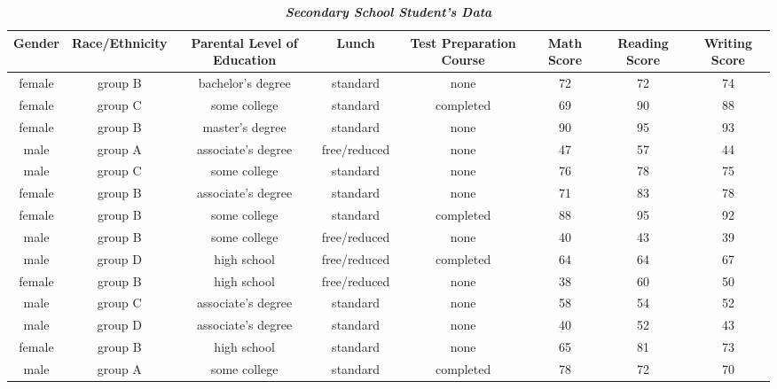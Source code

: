 \documentclass{article}
\begin{document}
 	\begin{table}[h!]
 		\begin{center}
 			\caption{\textbf{\textit{Secondary School Student's Data}}}
 			\label{tab:table1}
 			\begin{tabular}{|c|c|c|c|c|c|c|c|}
 				\hline
 			\textbf{Gender} & \textbf{Race/Ethnicity} & \textbf{Parental Level of Education} & \textbf{Lunch} & \textbf{Test Preparation Course} & \textbf{Math Score} & \textbf{Reading Score} & \textbf{Writing Score}\\
 				\hline
 				female & group B & bachelor's degree & standard & none & 72 & 72 & 74\\
 				\hline
 				female & group C & some college & standard & completed & 69 & 90 & 88\\
 				\hline
 				female & group B & master's degree & standard & none & 90 & 95 & 93\\
 				\hline
 				male & group A & associate's degree & free/reduced & none & 47 & 57 & 44\\
 				\hline
 				male & group C & some college & standard & none & 76 & 78 & 75\\
 				\hline
 				female & group B & associate's degree & standard & none & 71 & 83 & 78\\
 				\hline
 				female & group B & some college & standard & completed & 88 & 95 & 92\\
 				\hline
 				male & group B & some college & free/reduced & none & 40 & 43 & 39\\
 				\hline
 				male & group D & high school & free/reduced & completed & 64 & 64 & 67\\
 				\hline
 				female & group B & high school & free/reduced & none & 38 & 60 & 50\\
 				\hline
 				male & group C & associate's degree & standard & none & 58 & 54 &52\\
 				\hline
 				male & group D & associate's degree & standard & none & 40 & 52 & 43\\
 				\hline
 				female & group B & high school & standard & none & 65 & 81 & 73\\
 				\hline
 				male & group A & some college & standard & completed & 78 & 72 & 70\\
 				\hline
 				
 				\end{tabular}
 		\end{center}
 	\end{table}
 
\end{document}
